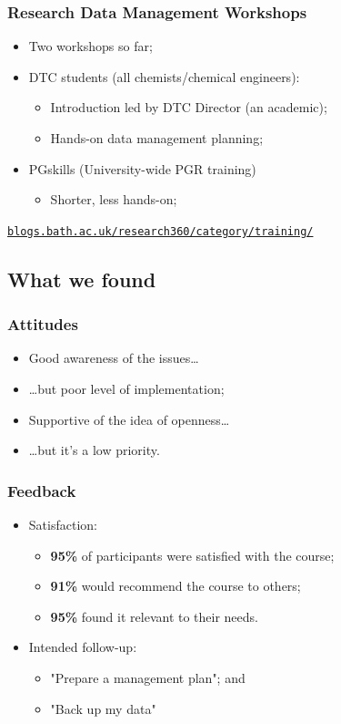 \documentclass{beamer}
\newcommand{\shorturl}[2]%
  [?utm\_source=jsc\&utm\_medium=presentation\&utm\_campaign=ox\_open\_sci\_2012]%
  {\href{http://#2#1}{\nolinkurl{#2}}}
\begin{document}
\begin{frame}
  \frametitle{Research Data Management Workshops}
  
  \begin{itemize}
    \item Two workshops so far;
    \item DTC students (all chemists/chemical engineers):
      \begin{itemize}
        \item Introduction led by DTC Director (an academic);
        \item Hands-on data management planning;
      \end{itemize}
    \item PGskills (University-wide PGR training)
      \begin{itemize}
        \item Shorter, less hands-on;
      \end{itemize}
  \end{itemize}

  \bigskip
  \shorturl{blogs.bath.ac.uk/research360/category/training/}
\end{frame}

\subsection{What we found}

\begin{frame}
  \frametitle{Attitudes}
  
  \begin{itemize}
    \item Good awareness of the issues\ldots
    \item \ldots but poor level of implementation;
    \item Supportive of the idea of openness\ldots
    \item \ldots but it's a low priority.
  \end{itemize}
\end{frame}

\begin{frame}
  \frametitle{Feedback}
  
  \begin{itemize}
    \item Satisfaction:
      \begin{itemize}
        \item \textbf{95\%} of participants were satisfied with the course;
        \item \textbf{91\%} would recommend the course to others;
        \item \textbf{95\%} found it relevant to their needs.
      \end{itemize}
    \item Intended follow-up:
      \begin{itemize}
        \item "Prepare a management plan"; and
        \item "Back up my data"
      \end{itemize}
  \end{itemize}
\end{frame}
\end{document}

